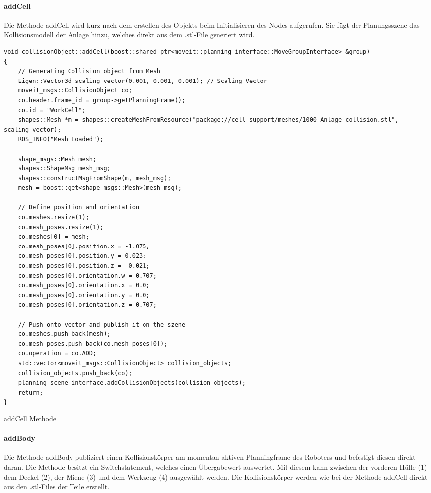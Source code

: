 \paragraph{addCell} Die Methode addCell wird kurz nach dem erstellen des Objekts beim Initialisieren des Nodes aufgerufen. Sie fügt der Planungsszene das Kollisionsmodell der Anlage hinzu, welches direkt aus dem .stl-File generiert wird. 
\begin{code}
	\begin{verbatim}
void collisionObject::addCell(boost::shared_ptr<moveit::planning_interface::MoveGroupInterface> &group)
{
    // Generating Collision object from Mesh
    Eigen::Vector3d scaling_vector(0.001, 0.001, 0.001); // Scaling Vector
    moveit_msgs::CollisionObject co;
    co.header.frame_id = group->getPlanningFrame();
    co.id = "WorkCell";
    shapes::Mesh *m = shapes::createMeshFromResource("package://cell_support/meshes/1000_Anlage_collision.stl", scaling_vector);
    ROS_INFO("Mesh Loaded");

    shape_msgs::Mesh mesh;
    shapes::ShapeMsg mesh_msg;
    shapes::constructMsgFromShape(m, mesh_msg);
    mesh = boost::get<shape_msgs::Mesh>(mesh_msg);

    // Define position and orientation
    co.meshes.resize(1);
    co.mesh_poses.resize(1);
    co.meshes[0] = mesh;
    co.mesh_poses[0].position.x = -1.075;
    co.mesh_poses[0].position.y = 0.023;
    co.mesh_poses[0].position.z = -0.021;
    co.mesh_poses[0].orientation.w = 0.707;
    co.mesh_poses[0].orientation.x = 0.0;
    co.mesh_poses[0].orientation.y = 0.0;
    co.mesh_poses[0].orientation.z = 0.707;

    // Push onto vector and publish it on the szene
    co.meshes.push_back(mesh);
    co.mesh_poses.push_back(co.mesh_poses[0]);
    co.operation = co.ADD;
    std::vector<moveit_msgs::CollisionObject> collision_objects;
    collision_objects.push_back(co);
    planning_scene_interface.addCollisionObjects(collision_objects);
    return;
}

	\end{verbatim}
\vspace{-10pt}
\caption{addCell Methode}
\label{code:addCell}
\end{code}

\paragraph{addBody}
Die Methode addBody publiziert einen Kollisionskörper am momentan aktiven Planningframe des Roboters und befestigt diesen direkt daran. Die Methode besitzt ein Switchstatement, welches einen Übergabewert auswertet. Mit diesem kann zwischen der vorderen Hülle (1) dem Deckel (2), der Miene (3) und dem Werkzeug (4) ausgewählt werden. Die Kollisionskörper werden wie bei der Methode addCell direkt aus den .stl-Files der Teile erstellt. 

